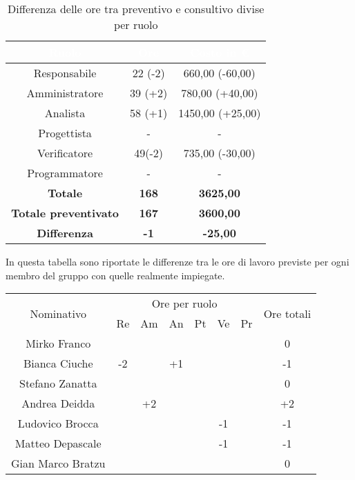\begin{flushleft}
	\begin{table}[!h]
		\begin{center}
			\begin{tabular}{ccc}
				\rowcolor{coolblack}
				\hline
				\textcolor{white}{Ruolo} & \textcolor{white}{Ore} & \textcolor{white}{Costo in \euro}\\
				\hline
				Responsabile   & 22 (-2)  &  660,00 (-60,00) 	\\ 
				Amministratore & 39 (+2)  &  780,00 (+40,00) 	\\ 
				Analista       & 58 (+1)  &  1450,00 (+25,00)   	\\ 
				Progettista    & -  	 &  - 					\\ 
				Verificatore   & 49(-2)  &  735,00 (-30,00) 	\\ 
				Programmatore  & -       &  -    		 		\\ \hline
				\textbf{Totale}& \textbf{168} & \textbf{3625,00}	\\ \hline 
				\textbf{Totale preventivato}& \textbf{167} & \textbf{3600,00}\\ \hline 
				\textbf{Differenza}& \textbf{-1} & \textbf{-25,00 }	\\ \hline  
			\end{tabular}
			\caption{Differenza delle ore tra preventivo e consultivo divise per ruolo} 
		\end{center}
	\end{table}
\newpage
    In questa tabella  sono riportate le differenze tra le ore di lavoro previste per ogni membro del gruppo con quelle realmente impiegate.
       \begin{table}[!h]
 	\begin{center}
 		\begin{tabularx}{\textwidth}{|c|cccccc|c|}
 			
 			\hline
 			\multirow{2}{*}{Nominativo} & \multicolumn{6}{c|}{Ore per ruolo} & \multirow{2}{*}{Ore totali} \\ \cline{2-7}
 			& Re & Am & An & Pt & Ve & Pr &      \\ \hline
 			\endhead
 			Mirko Franco       &   &    &  &    &  &  & 0    \\ \hline
 			Bianca Ciuche      & -2 &  & +1 &    &  &   & -1       \\ \hline
 			Stefano Zanatta    &   &  &  &  &   &   &    0   \\ \hline
 			Andrea Deidda      &   & +2 &   &   &  &   &  +2  		\\ \hline
 			Ludovico Brocca    &   &  &  &  & -1 &   & -1       \\ \hline
 			Matteo Depascale   &   &  &   &   &  -1 &  & -1  		\\ \hline
 			Gian Marco Bratzu  &   &  &   &   &  &   & 0        \\ \hline
 			

\end{tabularx}
\end{center}
\end{table}
\end{flushleft}
